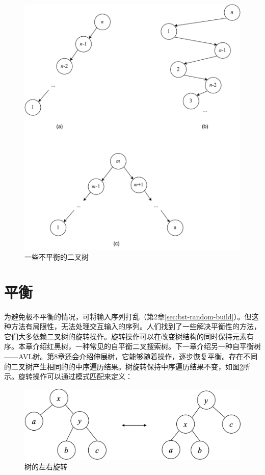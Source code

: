 \documentclass[b5paper]{ctexart}
\begin{document}
\begin{figure}[htbp]
  \centering
  \includegraphics[scale=0.5]{img/unbalanced-trees}
  \caption{一些不平衡的二叉树}
  \label{fig:unbalanced-trees}
\end{figure}

\section{平衡}

为避免极不平衡的情况，可将输入序列打乱（第2章\autoref{sec:bst-random-build}）。但这种方法有局限性，无法处理交互输入的序列。人们找到了一些解决平衡性的方法，它们大多依赖二叉树的旋转操作。旋转操作可以在改变树结构的同时保持元素有序。本章介绍红黑树，一种常见的自平衡二叉搜索树。下一章介绍另一种自平衡树——AVL树。第8章还会介绍伸展树，它能够随着操作，逐步恢复平衡。存在不同的二叉树产生相同的的中序遍历结果。树旋转保持中序遍历结果不变，如图\ref{fig:tree-rotation}所示。旋转操作可以通过模式匹配来定义：

\begin{figure}[htbp]
  \centering
  \includegraphics[scale=0.4]{img/tree-rotation}
  \caption{树的左右旋转}
  \label{fig:tree-rotation}
\end{figure}
\end{document}
